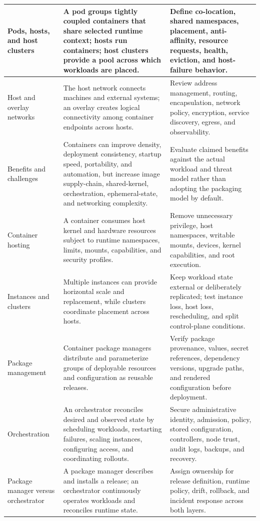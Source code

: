 \documentclass[11pt]{article}
\begin{document}
\begin{longtable}{@{}>{\RaggedRight\arraybackslash}p{}>{\RaggedRight\arraybackslash}p{}>{\RaggedRight\arraybackslash}p{}@{}}
Pods, hosts, and host clusters & A pod groups tightly coupled containers that share selected runtime context; hosts run containers; host clusters provide a pool across which workloads are placed. & Define co-location, shared namespaces, placement, anti-affinity, resource requests, health, eviction, and host-failure behavior. \\\midrule
Host and overlay networks & The host network connects machines and external systems; an overlay creates logical connectivity among container endpoints across hosts. & Review address management, routing, encapsulation, network policy, encryption, service discovery, egress, and observability. \\\midrule
Benefits and challenges & Containers can improve density, deployment consistency, startup speed, portability, and automation, but increase image supply-chain, shared-kernel, orchestration, ephemeral-state, and networking complexity. & Evaluate claimed benefits against the actual workload and threat model rather than adopting the packaging model by default. \\\midrule
Container hosting & A container consumes host kernel and hardware resources subject to runtime namespaces, limits, mounts, capabilities, and security profiles. & Remove unnecessary privilege, host namespaces, writable mounts, devices, kernel capabilities, and root execution. \\\midrule
Instances and clusters & Multiple instances can provide horizontal scale and replacement, while clusters coordinate placement across hosts. & Keep workload state external or deliberately replicated; test instance loss, host loss, rescheduling, and split control-plane conditions. \\\midrule
Package management & Container package managers distribute and parameterize groups of deployable resources and configuration as reusable releases. & Verify package provenance, values, secret references, dependency versions, upgrade paths, and rendered configuration before deployment. \\\midrule
Orchestration & An orchestrator reconciles desired and observed state by scheduling workloads, restarting failures, scaling instances, configuring access, and coordinating rollouts. & Secure administrative identity, admission, policy, stored configuration, controllers, node trust, audit logs, backups, and recovery. \\\midrule
Package manager versus orchestrator & A package manager describes and installs a release; an orchestrator continuously operates workloads and reconciles runtime state. & Assign ownership for release definition, runtime policy, drift, rollback, and incident response across both layers. \\\midrule

\end{longtable}
\end{document}
